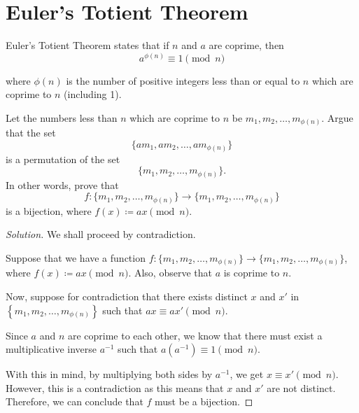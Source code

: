 \documentclass{article}
\newenvironment{solution}{\begin{proof}[Solution]}{\end{proof}}
\begin{document}
\newpage

\section{Euler's Totient Theorem}
Euler's Totient Theorem states that if $n$ and $a$ are coprime, then
\begin{equation*}
	a^{\phi(n)} \equiv 1 \pmod{n}
\end{equation*}

where $\phi(n)$ is the number of positive integers less than or equal to $n$ which are coprime to $n$ (including 1).

\begin{hw}
	Let the numbers less than $n$ which are coprime to $n$ be $m_1, m_2, \ldots, m_{\phi(n)}$. 
	Argue that the set
	\[\{am_1, am_2, \ldots, am_{\phi(n)}\}\]
	is a permutation of the set
	\[\{m_1, m_2, \ldots, m_{\phi(n)}\}.\]
	In other words, prove that 
	\[f:\{m_1, m_2, \ldots, m_{\phi(n)}\} \to \{m_1, m_2, \ldots, m_{\phi(n)}\}\]
	is a bijection, where $f(x) \coloneqq ax \pmod{n}$.
\end{hw}
\begin{solution}
	We shall proceed by contradiction.
	
	Suppose that we have a function $f : \{m_1, m_2, \ldots, m_{\phi(n)}\} \to \{m_1, m_2, \ldots, m_{\phi(n)}\}$, where $f(x) \coloneqq ax \pmod{n}$. Also, observe that $a$ is coprime to $n$.
	
	Now, suppose for contradiction that there exists distinct $x$ and $x'$ in $\left\{  m_{1}, m_{2}, \ldots, m_{\phi(n)}\right\}$ such that $ax \equiv ax' \pmod{n}$.
	
	Since $a$ and $n$ are coprime to each other, we know that there must exist a multiplicative inverse $a^{-1}$ such that $a(a^{-1}) \equiv 1 \pmod{n}$.
	
	With this in mind, by multiplying both sides by $a^{-1}$, we get $x \equiv x' \pmod{n}$. However, this is a contradiction as this means that $x$ and $x'$ are not distinct. Therefore, we can conclude that $f$ must be a bijection.
\end{solution}
\end{document}
